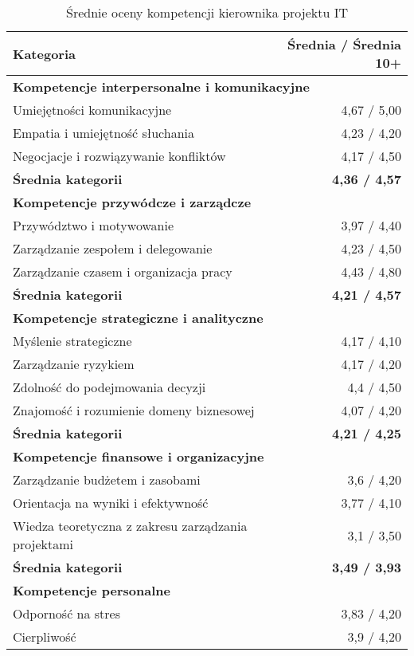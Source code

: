 \begin{table}[htbp]
\centering
\caption{Średnie oceny kompetencji kierownika projektu IT}
\begin{tabular}{p{8cm} r}
\toprule
\textbf{Kategoria} & \textbf{Średnia / Średnia 10+} \\
\midrule
\multicolumn{2}{l}{\textbf{Kompetencje interpersonalne i komunikacyjne}} \\
Umiejętności komunikacyjne & 4{,}67 / 5{,}00 \\
Empatia i umiejętność słuchania & 4{,}23 / 4{,}20 \\
Negocjacje i rozwiązywanie konfliktów & 4{,}17 / 4{,}50 \\
\textbf{Średnia kategorii} & \textbf{4{,}36 / 4{,}57} \\  
\midrule
\multicolumn{2}{l}{\textbf{Kompetencje przywódcze i zarządcze}} \\
Przywództwo i motywowanie & 3{,}97 / 4{,}40 \\
Zarządzanie zespołem i delegowanie & 4{,}23 / 4{,}50 \\
Zarządzanie czasem i organizacja pracy & 4{,}43 / 4{,}80 \\
\textbf{Średnia kategorii} & \textbf{4{,}21 / 4{,}57} \\
\midrule
\multicolumn{2}{l}{\textbf{Kompetencje strategiczne i analityczne}} \\
Myślenie strategiczne & 4{,}17 / 4{,}10 \\
Zarządzanie ryzykiem & 4{,}17 / 4{,}20 \\
Zdolność do podejmowania decyzji & 4{,}4 / 4{,}50 \\
Znajomość i rozumienie domeny biznesowej & 4{,}07 / 4{,}20 \\
\textbf{Średnia kategorii} & \textbf{4{,}21 / 4{,}25} \\
\midrule
\multicolumn{2}{l}{\textbf{Kompetencje finansowe i organizacyjne}} \\
Zarządzanie budżetem i zasobami & 3{,}6 / 4{,}20 \\
Orientacja na wyniki i efektywność & 3{,}77 / 4{,}10 \\
Wiedza teoretyczna z zakresu zarządzania projektami & 3{,}1 / 3{,}50 \\
\textbf{Średnia kategorii} & \textbf{3{,}49 / 3{,}93} \\
\midrule
\multicolumn{2}{l}{\textbf{Kompetencje personalne}} \\
Odporność na stres & 3{,}83 / 4{,}20 \\
Cierpliwość & 3{,}9 / 4{,}20 \\

\end{tabular}
\end{table}
